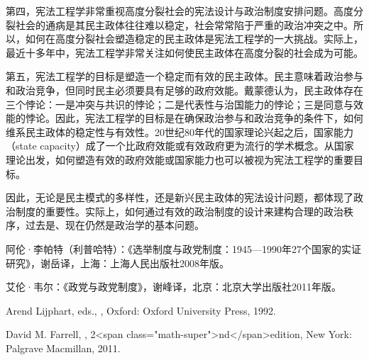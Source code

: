 第四，宪法工程学非常重视高度分裂社会的宪法设计与政治制度安排问题。高度分裂社会的通病是其民主政体往往难以稳定，社会常常陷于严重的政治冲突之中。所以，如何在高度分裂社会塑造稳定的民主政体是宪法工程学的一大挑战。实际上，最近十多年中，宪法工程学非常关注如何使民主政体在高度分裂的社会成为可能。

第五，宪法工程学的目标是塑造一个稳定而有效的民主政体。民主意味着政治参与和政治竞争，但同时民主必须要具有足够的政府效能。戴蒙德认为，民主政体存在三个悖论：一是冲突与共识的悖论；二是代表性与治国能力的悖论；三是同意与效能的悖论。因此，宪法工程学的目标是在确保政治参与和政治竞争的条件下，如何维系民主政体的稳定性与有效性。20世纪80年代的国家理论兴起之后，国家能力（state capacity）成了一个比政府效能或有效政府更为流行的学术概念。从国家理论出发，如何塑造有效的政府效能或国家能力也可以被视为宪法工程学的重要目标。

因此，无论是民主模式的多样性，还是新兴民主政体的宪法设计问题，都体现了政治制度的重要性。实际上，如何通过有效的政治制度的设计来建构合理的政治秩序，过去是、现在仍然是政治学的基本问题。


阿伦·李帕特（利普哈特）：《选举制度与政党制度：1945—1990年27个国家的实证研究》，谢岳译，上海：上海人民出版社2008年版。

艾伦·韦尔：《政党与政党制度》，谢峰译，北京：北京大学出版社2011年版。

Arend Lijphart, eds., , Oxford: Oxford University Press, 1992.

David M. Farrell, , 2<span class="math-super">nd</span>edition, New York: Palgrave Macmillan, 2011.
